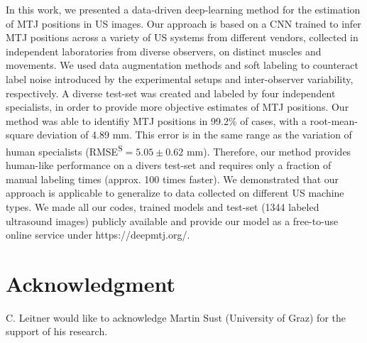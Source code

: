 \documentclass[journal,twoside,web]{ieeecolor}
\begin{document}
In this work, we presented a data-driven deep-learning method for the estimation of MTJ positions in US images. Our approach is based on a CNN trained to infer MTJ positions across a variety of US systems from different vendors, collected in independent laboratories from diverse observers, on distinct muscles and movements. We used data augmentation methods and soft labeling to counteract label noise introduced by the experimental setups and inter-observer variability, respectively. A diverse test-set was created and labeled by four independent specialists, in order to provide more objective estimates of MTJ positions. Our method was able to identifiy MTJ positions in 99.2\% of cases, with a root-mean-square deviation of 4.89 mm. 
This error is in the same range as the variation of human specialists (RMSE\textsuperscript{S}$ = 5.05 \pm0.62$ mm). Therefore, our method provides human-like performance on a divers test-set and requires only a fraction of manual labeling times (approx. 100 times faster). We demonstrated that our approach is applicable to generalize to data collected on different US machine types. We made all our codes, trained models and test-set (1344 labeled ultrasound images) publicly available and provide our model as a free-to-use online service under https://deepmtj.org/. 
\appendices
\section*{Acknowledgment}
C. Leitner would like to acknowledge Martin Sust (University of Graz) for the support of his research.
\end{document}
